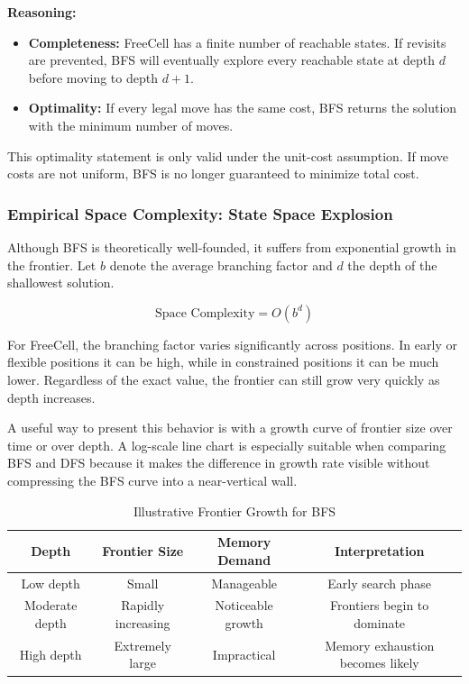 \documentclass{article}
\begin{document}
\textbf{Reasoning:}
\begin{itemize}
\item \textbf{Completeness:} FreeCell has a finite number of reachable states. If revisits are prevented, BFS will eventually explore every reachable state at depth $d$ before moving to depth $d+1$.
\item \textbf{Optimality:} If every legal move has the same cost, BFS returns the solution with the minimum number of moves.
\end{itemize}

This optimality statement is only valid under the unit-cost assumption. If move costs are not uniform, BFS is no longer guaranteed to minimize total cost.

\subsubsection{Empirical Space Complexity: State Space Explosion}

Although BFS is theoretically well-founded, it suffers from exponential growth in the frontier. Let $b$ denote the average branching factor and $d$ the depth of the shallowest solution.

\begin{equation}
\text{Space Complexity} = O(b^d)
\end{equation}

For FreeCell, the branching factor varies significantly across positions. In early or flexible positions it can be high, while in constrained positions it can be much lower. Regardless of the exact value, the frontier can still grow very quickly as depth increases.

A useful way to present this behavior is with a growth curve of frontier size over time or over depth. A log-scale line chart is especially suitable when comparing BFS and DFS because it makes the difference in growth rate visible without compressing the BFS curve into a near-vertical wall.

\begin{table}[h]
\centering
\caption{Illustrative Frontier Growth for BFS}
\begin{tabular}{cccc}
\toprule
Depth & Frontier Size & Memory Demand & Interpretation \\
\midrule
Low depth & Small & Manageable & Early search phase \\
Moderate depth & Rapidly increasing & Noticeable growth & Frontiers begin to dominate \\
High depth & Extremely large & Impractical & Memory exhaustion becomes likely \\
\bottomrule
\end{tabular}
\end{table}
\end{document}

